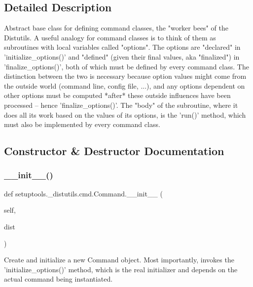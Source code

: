 \subsection{Detailed Description}
\begin{DoxyVerb}Abstract base class for defining command classes, the "worker bees"
of the Distutils.  A useful analogy for command classes is to think of
them as subroutines with local variables called "options".  The options
are "declared" in 'initialize_options()' and "defined" (given their
final values, aka "finalized") in 'finalize_options()', both of which
must be defined by every command class.  The distinction between the
two is necessary because option values might come from the outside
world (command line, config file, ...), and any options dependent on
other options must be computed *after* these outside influences have
been processed -- hence 'finalize_options()'.  The "body" of the
subroutine, where it does all its work based on the values of its
options, is the 'run()' method, which must also be implemented by every
command class.
\end{DoxyVerb}
 

\subsection{Constructor \& Destructor Documentation}
\mbox{\label{classsetuptools_1_1__distutils_1_1cmd_1_1Command_a8cdb4924d46154ac41da81fd78e8c295}} 
\subsubsection{\texorpdfstring{\+\_\+\+\_\+init\+\_\+\+\_\+()}{\_\_init\_\_()}}
{\footnotesize\ttfamily def setuptools.\+\_\+distutils.\+cmd.\+Command.\+\_\+\+\_\+init\+\_\+\+\_\+ (\begin{DoxyParamCaption}\item[{}]{self,  }\item[{}]{dist }\end{DoxyParamCaption})}

\begin{DoxyVerb}Create and initialize a new Command object.  Most importantly,
invokes the 'initialize_options()' method, which is the real
initializer and depends on the actual command being
instantiated.
\end{DoxyVerb}
 

